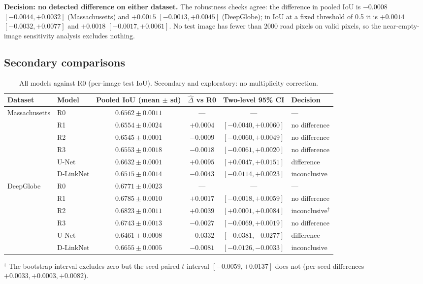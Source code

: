 \documentclass[11pt]{article}
\begin{document}
\textbf{Decision: no detected difference on either dataset.} The robustness checks agree: the
difference in pooled IoU is $-0.0008$ $[-0.0044, +0.0032]$ (Massachusetts) and $+0.0015$
$[-0.0013, +0.0045]$ (DeepGlobe); in IoU at a fixed threshold of 0.5 it is $+0.0014$
$[-0.0032, +0.0077]$ and $+0.0018$ $[-0.0017, +0.0061]$. No test image has fewer than 2000 road
pixels on valid pixels, so the near-empty-image sensitivity analysis excludes nothing.

\subsection{Secondary comparisons}

\begin{table}[h]
\centering
\caption{All models against R0 (per-image test IoU). Secondary and exploratory: no multiplicity correction.}
\label{tab:secondary}
\small
\begin{tabular}{@{}llcccl@{}}
\toprule
Dataset & Model & Pooled IoU (mean $\pm$ sd) & $\hat\Delta$ vs R0 & Two-level 95\% CI & Decision \\
\midrule
\multirow{6}{*}{Massachusetts}
 & R0 & $0.6562 \pm 0.0011$ & --- & --- & --- \\
 & R1 & $0.6554 \pm 0.0024$ & $+0.0004$ & $[-0.0040, +0.0060]$ & no difference \\
 & R2 & $0.6545 \pm 0.0001$ & $-0.0009$ & $[-0.0060, +0.0049]$ & no difference \\
 & R3 & $0.6553 \pm 0.0018$ & $-0.0018$ & $[-0.0061, +0.0020]$ & no difference \\
 & U-Net & $0.6632 \pm 0.0001$ & $+0.0095$ & $[+0.0047, +0.0151]$ & difference \\
 & D-LinkNet & $0.6515 \pm 0.0014$ & $-0.0043$ & $[-0.0114, +0.0023]$ & inconclusive \\
\midrule
\multirow{6}{*}{DeepGlobe}
 & R0 & $0.6771 \pm 0.0023$ & --- & --- & --- \\
 & R1 & $0.6785 \pm 0.0010$ & $+0.0017$ & $[-0.0018, +0.0059]$ & no difference \\
 & R2 & $0.6823 \pm 0.0011$ & $+0.0039$ & $[+0.0001, +0.0084]$ & inconclusive$^\dagger$ \\
 & R3 & $0.6743 \pm 0.0013$ & $-0.0027$ & $[-0.0069, +0.0019]$ & no difference \\
 & U-Net & $0.6461 \pm 0.0008$ & $-0.0332$ & $[-0.0381, -0.0277]$ & difference \\
 & D-LinkNet & $0.6655 \pm 0.0005$ & $-0.0081$ & $[-0.0126, -0.0033]$ & inconclusive \\
\bottomrule
\end{tabular}

\vspace{2pt}
{\footnotesize $^\dagger$ The bootstrap interval excludes zero but the seed-paired $t$ interval
$[-0.0059, +0.0137]$ does not (per-seed differences $+0.0033, +0.0003, +0.0082$).}
\end{table}
\end{document}
